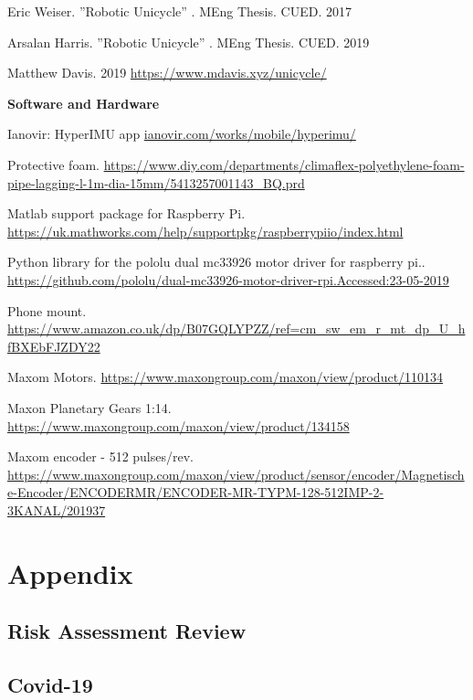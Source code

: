 \documentclass[twoside,twocolumn,12pt]{article}
\begin{document}
\begin{thebibliography}{56}
Eric Weiser. ''Robotic Unicycle'' . MEng Thesis. CUED. 2017

Arsalan Harris. ''Robotic Unicycle'' . MEng Thesis. CUED. 2019
 
Matthew Davis. 2019 \url{https://www.mdavis.xyz/unicycle/}



\phantom{please be invisible}
\centerline{\bfseries Software and Hardware} 

Ianovir: HyperIMU app 
\url{ianovir.com/works/mobile/hyperimu/}

Protective foam. \url{https://www.diy.com/departments/climaflex-polyethylene-foam-pipe-lagging-l-1m-dia-15mm/5413257001143_BQ.prd}

Matlab support package for Raspberry Pi. \url{https://uk.mathworks.com/help/supportpkg/raspberrypiio/index.html}

Python library for the pololu dual mc33926 motor driver for raspberry pi.. \url{https://github.com/pololu/dual-mc33926-motor-driver-rpi.Accessed:23-05-2019}

Phone mount. \url{https://www.amazon.co.uk/dp/B07GQLYPZZ/ref=cm_sw_em_r_mt_dp_U_hfBXEbFJZDY22}

Maxom Motors. \url{https://www.maxongroup.com/maxon/view/product/110134}

Maxon Planetary Gears 1:14. \url{https://www.maxongroup.com/maxon/view/product/134158}

Maxom encoder - 512 pulses/rev. \url{https://www.maxongroup.com/maxon/view/product/sensor/encoder/Magnetische-Encoder/ENCODERMR/ENCODER-MR-TYPM-128-512IMP-2-3KANAL/201937}

\end{thebibliography}



\clearpage
\section{Appendix}
\subsection{Risk Assessment Review}

\clearpage
\subsection{Covid-19}




\end{document}
